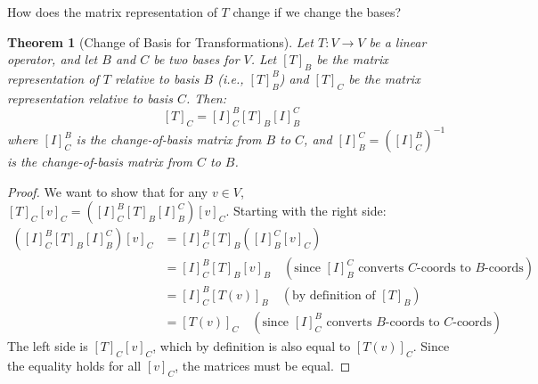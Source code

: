 \documentclass[11pt, a4paper]{article}
\theoremstyle{mydefinitionstyle}
\theoremstyle{mytheoremstyle}
\newtheorem{theorem}{Theorem}[section]
\begin{document}
How does the matrix representation of $T$ change if we change the bases?

\begin{theorem}[Change of Basis for Transformations] \label{thm:change_basis_trans}
    Let $T: V \to V$ be a linear operator, and let $B$ and $C$ be two bases for $V$. Let $[T]_B$ be the matrix representation of $T$ relative to basis $B$ (i.e., $[T]_B^B$) and $[T]_C$ be the matrix representation relative to basis $C$. Then:
    \[ [T]_C = [I]_C^B [T]_B [I]_B^C \]
    where $[I]_C^B$ is the change-of-basis matrix from $B$ to $C$, and $[I]_B^C = ([I]_C^B)^{-1}$ is the change-of-basis matrix from $C$ to $B$.
\end{theorem}
\begin{proof}
    We want to show that for any $v \in V$, $[T]_C [v]_C = ([I]_C^B [T]_B [I]_B^C) [v]_C$.
    Starting with the right side:
    \begin{align*} ([I]_C^B [T]_B [I]_B^C) [v]_C &= [I]_C^B [T]_B ([I]_B^C [v]_C) \\ &= [I]_C^B [T]_B [v]_B \quad (\text{since } [I]_B^C \text{ converts } C \text{-coords to } B \text{-coords}) \\ &= [I]_C^B [T(v)]_B \quad (\text{by definition of } [T]_B) \\ &= [T(v)]_C \quad (\text{since } [I]_C^B \text{ converts } B \text{-coords to } C \text{-coords}) \end{align*}
    The left side is $[T]_C [v]_C$, which by definition is also equal to $[T(v)]_C$. Since the equality holds for all $[v]_C$, the matrices must be equal.
\end{proof}
\end{document}
